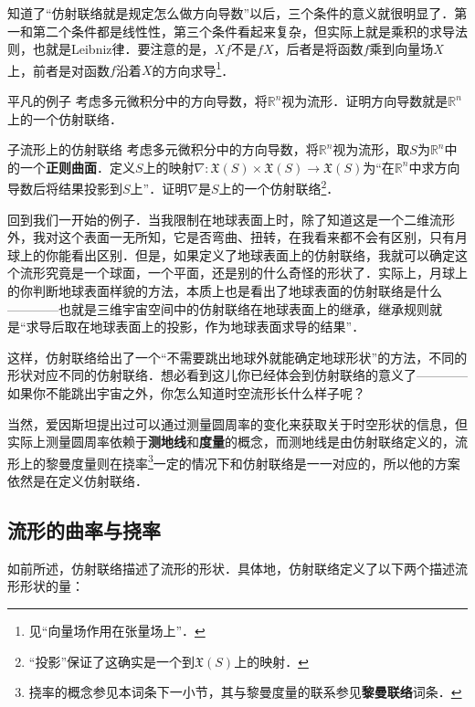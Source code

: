 知道了“仿射联络就是规定怎么做方向导数”以后，三个条件的意义就很明显了．第一和第二个条件都是线性性，第三个条件看起来复杂，但实际上就是乘积的求导法则，也就是Leibniz律．要注意的是，$Xf$不是$fX$，后者是将函数$f$乘到向量场$X$上，前者是对函数$f$沿着$X$的方向求导\footnote{见“向量场作用在张量场上”．}．

\begin{exercise}{平凡的例子}
考虑多元微积分中的方向导数，将$\mathbb{R}^n$视为流形．证明方向导数就是$\mathbb{R}^n$上的一个仿射联络．
\end{exercise}

\begin{exercise}{子流形上的仿射联络}
考虑多元微积分中的方向导数，将$\mathbb{R}^n$视为流形，取$S$为$\mathbb{R}^n$中的一个\textbf{正则曲面}．定义$S$上的映射$\nabla:\mathfrak{X}(S)\times\mathfrak{X}(S)\to\mathfrak{X}(S)$为“在$\mathbb{R}^n$中求方向导数后将结果投影到$S$上”．证明$\nabla$是$S$上的一个仿射联络\footnote{“投影”保证了这确实是一个到$\mathfrak{X}(S)$上的映射．}．
\end{exercise}

回到我们一开始的例子．当我限制在地球表面上时，除了知道这是一个二维流形外，我对这个表面一无所知，它是否弯曲、扭转，在我看来都不会有区别，只有月球上的你能看出区别．但是，如果定义了地球表面上的仿射联络，我就可以确定这个流形究竟是一个球面，一个平面，还是别的什么奇怪的形状了．实际上，月球上的你判断地球表面样貌的方法，本质上也是看出了地球表面的仿射联络是什么————也就是三维宇宙空间中的仿射联络在地球表面上的继承，继承规则就是“求导后取在地球表面上的投影，作为地球表面求导的结果”．

这样，仿射联络给出了一个“不需要跳出地球外就能确定地球形状”的方法，不同的形状对应不同的仿射联络．想必看到这儿你已经体会到仿射联络的意义了————如果你不能跳出宇宙之外，你怎么知道时空流形长什么样子呢？

当然，爱因斯坦提出过可以通过测量圆周率的变化来获取关于时空形状的信息，但实际上测量圆周率依赖于\textbf{测地线}和\textbf{度量}的概念，而测地线是由仿射联络定义的，流形上的黎曼度量则在挠率\footnote{挠率的概念参见本词条下一小节，其与黎曼度量的联系参见\textbf{黎曼联络}词条．}一定的情况下和仿射联络是一一对应的，所以他的方案依然是在定义仿射联络．

\subsection{流形的曲率与挠率}

如前所述，仿射联络描述了流形的形状．具体地，仿射联络定义了以下两个描述流形形状的量：

